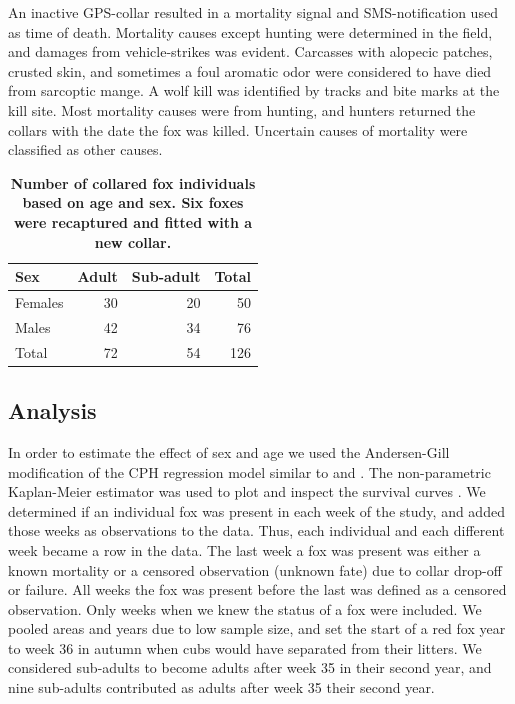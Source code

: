 An inactive GPS-collar resulted in a mortality signal and SMS-notification used as time of death. Mortality causes except hunting were determined in the field, and damages from vehicle-strikes was evident. Carcasses with alopecic patches, crusted skin, and sometimes a foul aromatic odor were considered to have died from sarcoptic mange. A wolf kill was identified by tracks and bite marks at the kill site. Most mortality causes were from hunting, and hunters returned the collars with the date the fox was killed. Uncertain causes of mortality were classified as other causes.


\begin{table}[t]
\centering
\captionsetup{font=small}
\caption{\textbf{Number of collared fox individuals based on age and sex. Six foxes were recaptured and fitted with a new collar.}}
\label{table:capt}
\begin{tabular}{lrr|r}
\toprule
Sex & Adult & Sub-adult & Total \\
\midrule
Females   & 30 & 20 & 50 \\
Males     & 42 & 34 & 76 \\
\midrule
Total     & 72 & 54 & 126 \\
\bottomrule
\end{tabular}
\end{table}


\subsection*{Analysis}

In order to estimate the effect of sex and age we used the Andersen-Gill modification of the CPH regression model\citep{andersenCoxsRegressionModel1982} similar to \citep{johnsonModelingSurvivalApplication2004} and \citet{ahlenSurvivalFemaleCapercaillie2013}. The non-parametric Kaplan-Meier estimator was used to plot and inspect the survival curves \citep{pollockSurvivalAnalysisTelemetry1989}. We determined if an individual fox was present in each week of the study, and added those weeks as observations to the data. Thus, each individual and each different week became a row in the data. The last week a fox was present was either a known mortality or a censored observation (unknown fate) due to collar drop-off or failure. All weeks the fox was present before the last was defined as a censored observation. Only weeks when we knew the status of a fox were included. We pooled areas and years due to low sample size, and set the start of a red fox year to week 36 in autumn when cubs would have separated from their litters. We considered sub-adults to become adults after week 35 in their second year, and nine sub-adults contributed as adults after week 35 their second year.  


